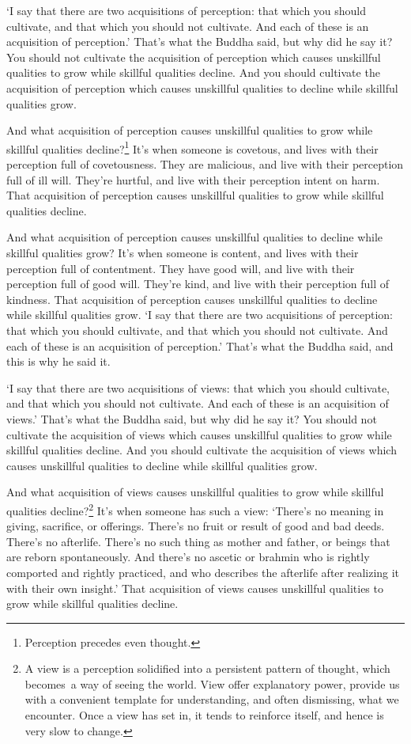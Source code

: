 \documentclass[12pt,openany]{book}%
\begin{document}
‘I say that there are two acquisitions of perception: that which you should cultivate, and that which you should not cultivate. And each of these is an acquisition of perception.’ That’s what the Buddha said, but why did he say it? You should not cultivate the acquisition of perception which causes unskillful qualities to grow while skillful qualities decline. And you should cultivate the acquisition of perception which causes unskillful qualities to decline while skillful qualities grow. 

And what acquisition of perception causes unskillful qualities to grow while skillful qualities decline?\footnote{Perception precedes even thought. } It’s when someone is covetous, and lives with their perception full of covetousness. They are malicious, and live with their perception full of ill will. They’re hurtful, and live with their perception intent on harm. That acquisition of perception causes unskillful qualities to grow while skillful qualities decline. 

And what acquisition of perception causes unskillful qualities to decline while skillful qualities grow? It’s when someone is content, and lives with their perception full of contentment. They have good will, and live with their perception full of good will. They’re kind, and live with their perception full of kindness. That acquisition of perception causes unskillful qualities to decline while skillful qualities grow. ‘I say that there are two acquisitions of perception: that which you should cultivate, and that which you should not cultivate. And each of these is an acquisition of perception.’ That’s what the Buddha said, and this is why he said it. 

‘I say that there are two acquisitions of views: that which you should cultivate, and that which you should not cultivate. And each of these is an acquisition of views.’ That’s what the Buddha said, but why did he say it? You should not cultivate the acquisition of views which causes unskillful qualities to grow while skillful qualities decline. And you should cultivate the acquisition of views which causes unskillful qualities to decline while skillful qualities grow. 

And what acquisition of views causes unskillful qualities to grow while skillful qualities decline?\footnote{A view is a perception solidified into a persistent pattern of thought, which becomes a way of seeing the world. View offer explanatory power, provide us with a convenient template for understanding, and often dismissing, what we encounter. Once a view has set in, it tends to reinforce itself, and hence is very slow to change. } It’s when someone has such a view: ‘There’s no meaning in giving, sacrifice, or offerings. There’s no fruit or result of good and bad deeds. There’s no afterlife. There’s no such thing as mother and father, or beings that are reborn spontaneously. And there’s no ascetic or brahmin who is rightly comported and rightly practiced, and who describes the afterlife after realizing it with their own insight.’ That acquisition of views causes unskillful qualities to grow while skillful qualities decline. 
\end{document}
